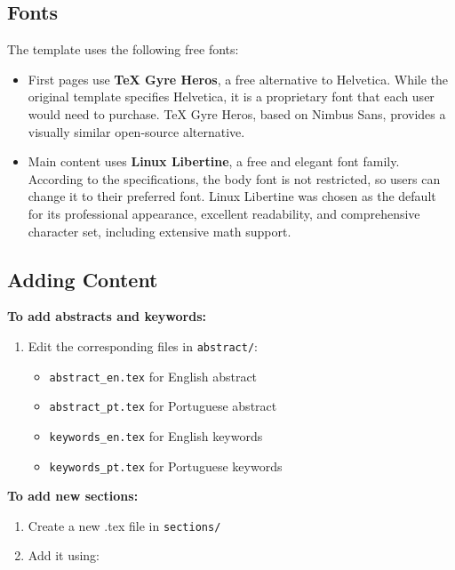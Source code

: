\subsection{Fonts}
The template uses the following free fonts:
\begin{itemize}
    \item First pages use \textbf{TeX Gyre Heros}, a free alternative to Helvetica. While the original template specifies Helvetica, it is a proprietary font that each user would need to purchase. TeX Gyre Heros, based on Nimbus Sans, provides a visually similar open-source alternative.
    \item Main content uses \textbf{Linux Libertine}, a free and elegant font family. According to the specifications, the body font is not restricted, so users can change it to their preferred font. Linux Libertine was chosen as the default for its professional appearance, excellent readability, and comprehensive character set, including extensive math support.
\end{itemize}

\subsection{Adding Content}
\textbf{To add abstracts and keywords:}
\begin{enumerate}
    \item Edit the corresponding files in \texttt{abstract/}:
    \begin{itemize}
        \item \texttt{abstract\_en.tex} for English abstract
        \item \texttt{abstract\_pt.tex} for Portuguese abstract
        \item \texttt{keywords\_en.tex} for English keywords
        \item \texttt{keywords\_pt.tex} for Portuguese keywords
    \end{itemize}
\end{enumerate}

\textbf{To add new sections:}
\begin{enumerate}
    \item Create a new .tex file in \texttt{sections/}
    \item Add it using:
    \begin{verbatim}
    
    \end{verbatim}
\end{enumerate}

